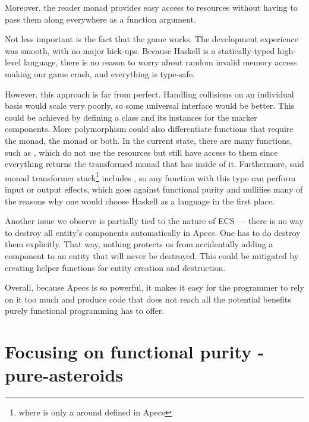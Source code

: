 \documentclass[
  digital, %
  table,   %
  twoside, %
  lof,     %
  lot,     %
]{fithesis3}
\begin{document}
Moreover, the  reader monad provides easy
access to resources without having to pass them along everywhere as a function argument.

Not less important is the fact that the game works.
The development experience was smooth, with no major hick-ups.
Because Haskell is a statically-typed high-level language, there is
no reason to worry about random invalid memory access making our game crash,
and everything is type-safe.

However, this approach is far from perfect. Handling collisions on an
individual basis would scale very poorly, so some universal interface would be better.
This could be achieved by defining a class and its instances for the marker components.
More polymorphism could also differentiate functions that require the
 monad, the  monad or both.
In the current state, there are many functions, such as ,
which do not use the resources but still have access to them since
everything returns the transformed  monad
that has  inside of it. Furthermore,
said monad transformer stack\footnote{
where  is only a 
around  defined in Apecs
}
includes , so any function with this type can perform
input or output effects, which goes against functional purity and nullifies
many of the reasons why one would choose Haskell as a language in the first place.

Another issue we observe is partially tied to the nature of ECS — there
is no way to destroy all entity's components automatically in Apecs.
One has to do destroy them explicitly. That way, nothing protects us
from accidentally adding a component to an entity that will never be destroyed.
This could be mitigated by creating helper functions for entity creation and destruction.

Overall, because Apecs is so powerful, it makes it easy for the programmer to rely
on it too much and produce code that does not reach all the potential
benefits purely functional programming has to offer.



\chapter{Focusing on functional purity - pure-asteroids}
\end{document}
